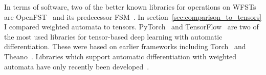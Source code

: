 In terms of software, two of the better known libraries for operations on WFSTs
are OpenFST~\citep{mohri2000design} and its predecessor
FSM~\citep{allauzen2007openfst}. In section~\ref{sec:comparison_to_tensors} I
compared weighted automata to tensors. PyTorch~\citep{paszke2019pytorch} and
TensorFlow~\citep{abadi2016tensorflow} are two of the most used libraries for
tensor-based deep learning with automatic differentiation. These were based on
earlier frameworks including Torch~\citep{collobert2011torch7} and
Theano~\citep{bergstra2010theano}. Libraries which support automatic
differentiation with weighted automata have only recently been
developed~\citep{k2, hannun2020differentiable}.
